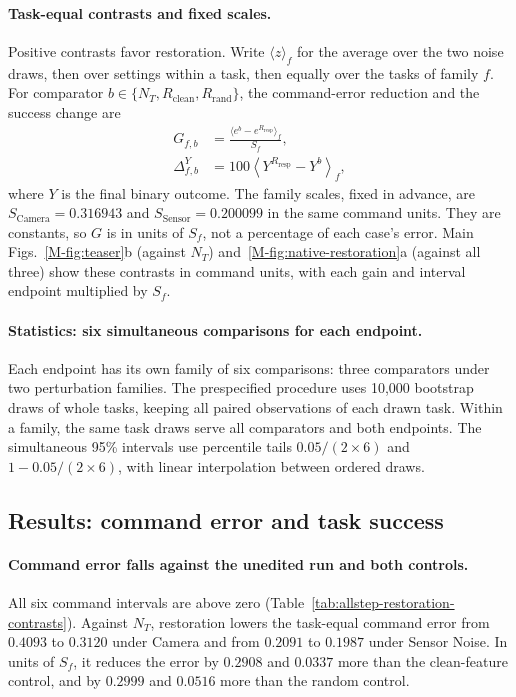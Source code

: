 \paragraph{Task-equal contrasts and fixed scales.}
Positive contrasts favor restoration. Write $\langle z\rangle_f$ for the average over the two noise draws, then over settings within a task, then equally over the tasks of family $f$. For comparator $b\in\{N_T,R_{\mathrm{clean}},R_{\mathrm{rand}}\}$, the command-error reduction and the success change are
\begin{align}
 G_{f,b}&=\frac{\langle e^b-e^{R_{\mathrm{resp}}}\rangle_f}{S_f},\\
 \Delta^{Y}_{f,b}&=100\left\langle Y^{R_{\mathrm{resp}}}-Y^b\right\rangle_f,
\end{align}
where $Y$ is the final binary outcome. The family scales, fixed in advance, are $S_{\mathrm{Camera}}=0.316943$ and $S_{\mathrm{Sensor}}=0.200099$ in the same command units. They are constants, so $G$ is in units of $S_f$, not a percentage of each case's error. Main Figs.~\ref*{M-fig:teaser}b (against $N_T$) and~\ref*{M-fig:native-restoration}a (against all three) show these contrasts in command units, with each gain and interval endpoint multiplied by $S_f$.

\paragraph{Statistics: six simultaneous comparisons for each endpoint.}
Each endpoint has its own family of six comparisons: three comparators under two perturbation families. The prespecified procedure uses 10,000 bootstrap draws of whole tasks, keeping all paired observations of each drawn task. Within a family, the same task draws serve all comparators and both endpoints. The simultaneous 95\% intervals use percentile tails $0.05/(2\times6)$ and $1-0.05/(2\times6)$, with linear interpolation between ordered draws.

\subsection{Results: command error and task success}

\paragraph{Command error falls against the unedited run and both controls.}
All six command intervals are above zero (Table~\ref{tab:allstep-restoration-contrasts}). Against $N_T$, restoration lowers the task-equal command error from $0.4093$ to $0.3120$ under Camera and from $0.2091$ to $0.1987$ under Sensor Noise. In units of $S_f$, it reduces the error by $0.2908$ and $0.0337$ more than the clean-feature control, and by $0.2999$ and $0.0516$ more than the random control.

